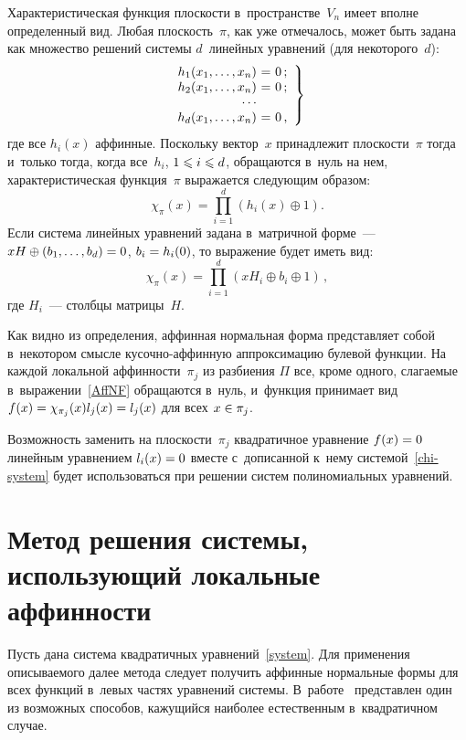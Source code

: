 \begin{multicols}{2}
Характеристическая функция плоскости в~пространстве~$V_n$ имеет вполне 
определенный вид. Любая плоскость~$\pi$, как уже отмечалось, может быть задана 
как множество решений системы $d$~линейных уравнений (для некоторого~$d$):
\begin{equation}
\label{chi-system}
  \left.
    \begin{array}{r@{\ }c@{\ }l}
        h_1(x_1,\ldots,x_n)&=&0\,;\\
        h_2(x_1,\ldots,x_n)&=&0\,;\\
        \cdots\\
        h_d(x_1,\ldots,x_n)&=&0\,,\\
    \end{array}
  \right\}
\end{equation}
где все $h_i(x)$ аффинные. Поскольку вектор~$x$ принадлежит плоскости~$\pi$ 
тогда и~только тогда, когда все~$h_i$, $1\hm\leqslant i\hm\leqslant d$, обращаются в~нуль на 
нем, характеристическая функция~$\pi$ выражается следующим образом:
$$\chi_{\pi}(x)=\prod_{i=1}^d (h_i(x)\oplus 1).$$
Если система линейных уравнений задана в~мат\-рич\-ной форме~--- $xH\oplus 
(b_1,\ldots,b_d)\hm=0$, $b_i\hm=h_i(0)$, то выражение будет иметь вид:
$$
\chi_{\pi}(x)=\prod\limits_{i=1}^d \left(xH_i\oplus b_i\oplus 1\right)\,,$$
где $H_i$~--- столбцы матрицы~$H$.

Как видно из определения, аффинная нормальная форма представляет собой 
в~некотором смыс\-ле ку\-соч\-но-аффин\-ную аппроксимацию булевой функции. На каждой 
локальной аф\-фин\-ности~$\pi_j$ из разбиения $\Pi$ все, кроме одного, слагаемые 
в~выражении~\eqref{AffNF} обращаются в~нуль, и~функция принимает вид 
$f(x)\hm=\chi_{\pi_j}(x)l_j(x)=l_j(x)$ для всех $x\hm\in\pi_j$.

Возможность заменить на плоскости~$\pi_j$ квадратичное уравнение $f(x)\hm=0$ 
линейным уравнением $l_i(x)\hm=0$ вместе с~дописанной к~нему системой~\eqref{chi-system} 
будет использоваться при решении систем полиномиальных уравнений.


\section{Метод решения системы, использующий локальные аффинности}
\label{method}

Пусть дана система квадратичных уравнений~\eqref{system}. Для применения 
описываемого далее метода следует получить аффинные нормальные формы для всех 
функций в~левых частях уравнений системы. В~работе~\cite{LSF2019} пред\-став\-лен 
один из возможных способов, кажущийся наиболее естественным в~квадратичном 
случае.




\end{multicols}
